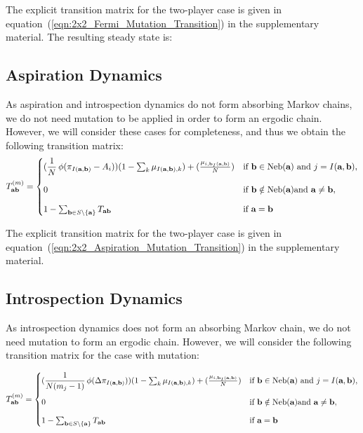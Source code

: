 \documentclass{article}
\begin{document}
The explicit transition matrix for the two-player case is given in
equation~(\ref{eqn:2x2_Fermi_Mutation_Transition}) in the supplementary
material. The resulting steady state is:

\subsection{Aspiration Dynamics}
As aspiration and introspection dynamics do not form absorbing Markov chains,
we do not need mutation to be applied in order to form an ergodic chain.
However, we will consider these cases for completeness, and thus we obtain the
following transition matrix:
\[
T^{(m)}_{\textbf{ab}} =
\begin{cases}
(\dfrac{1}{N} \, \phi (\pi_{I(\textbf{a}, \textbf{b})} - A_i))(1-\sum_{k}\mu_{I(\textbf{a}, \textbf{b}),k}) + (\frac{\mu_{i,\textbf{b}_I(\textbf{a}, \textbf{b})}}{N})
    & \text{if } \textbf{b} \in \mathrm{Neb}(\textbf{a}) \text{ and } j = I(\textbf{a}, \textbf{b}),\\[1.2em]
0
    & \text{if } \textbf{b} \notin \mathrm{Neb}(\textbf{a}) \text{and \textbf{a}} \neq \textbf{b},\\[0.8em]
1 - \sum_{\textbf{b} \in S \setminus \text{\{\textbf{a}\}}}T_{\textbf{ab}} & \text{if }\textbf{a}=\textbf{b}
\end{cases}
\]

The explicit transition matrix for the two-player case is given in
equation~(\ref{eqn:2x2_Aspiration_Mutation_Transition}) in the supplementary
material.


\subsection{Introspection Dynamics}
As introspection dynamics does not form an absorbing Markov chain, we do not
need mutation to form an ergodic chain.
However, we will consider the following transition matrix for the case with
mutation:

\[
T^{(m)}_{\textbf{ab}} =
\begin{cases}
(\dfrac{1}{N(m_j - 1)} \, \phi (\Delta \pi_{I(\textbf{a}, \textbf{b})}))(1-\sum_{k}\mu_{I(\textbf{a}, \textbf{b}),k}) + (\frac{\mu_{i,\textbf{b}_I(\textbf{a}, \textbf{b})}}{N})
    & \text{if } \textbf{b} \in \mathrm{Neb}(\textbf{a}) \text{ and } j = I(\textbf{a}, \textbf{b}),\\[1.2em]
0
    & \text{if } \textbf{b} \notin \mathrm{Neb}(\textbf{a}) \text{and \textbf{a}} \neq \textbf{b},\\[0.8em]
1 - \sum_{\textbf{b} \in S \setminus \text{\{\textbf{a}\}}}T_{\textbf{ab}} & \text{if }\textbf{a}=\textbf{b}
\end{cases}
\]
\end{document}
